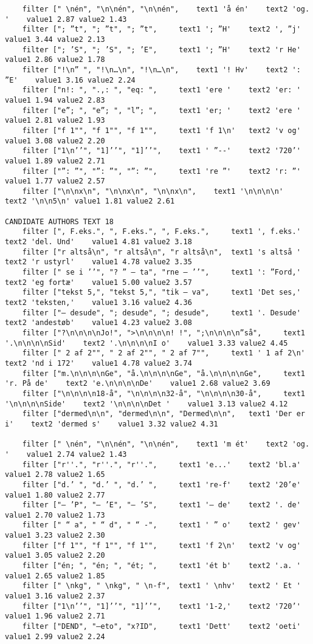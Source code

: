 {\begin{verbatim}
	filter [" \nén", "\n\nén", "\n\nén", 	text1 'å én'	text2 'og. '	value1 2.87	value2 1.43
	filter ["; ”t", "; ”t", "; ”t", 	text1 '; ”H'	text2 ', ”j'	value1 3.44	value2 2.13
	filter ["; ’S", "; ’S", "; ’E", 	text1 '; ”H'	text2 'r He'	value1 2.86	value2 1.78
	filter ["!\n” ", "!\n…\n", "!\n…\n", 	text1 '! Hv'	text2 ': ”E'	value1 3.16	value2 2.24
	filter ["n!: ", ".,: ", "eq: ", 	text1 'ere '	text2 'er: '	value1 1.94	value2 2.83
	filter ["e”; ", "e”; ", "l”; ", 	text1 'er; '	text2 'ere '	value1 2.81	value2 1.93
	filter ["f 1"", "f 1"", "f 1"", 	text1 'f 1\n'	text2 'v og'	value1 3.08	value2 2.20
	filter ["1\n’’", "1]’’", "1]’’", 	text1 ' ”--'	text2 '720’'	value1 1.89	value2 2.71
	filter ["”: ”", "”: ”", "”: ”", 	text1 're ”'	text2 'r: ”'	value1 1.77	value2 2.57
	filter ["\n\nx\n", "\n\nx\n", "\n\nx\n", 	text1 '\n\n\n\n'	text2 '\n\n5\n'	value1 1.81	value2 2.61

CANDIDATE AUTHORS TEXT 18
	filter [", F.eks.", ", F.eks.", ", F.eks.", 	text1 ', f.eks.'	text2 'del. Und'	value1 4.81	value2 3.18
	filter ["r altså\n", "r altså\n", "r altså\n", 	text1 's altså '	text2 'r ustyrl'	value1 4.78	value2 3.35
	filter [" se i ’’", "? ” – ta", "rne – ’’", 	text1 ': ”Ford,'	text2 'eg fortæ'	value1 5.00	value2 3.57
	filter ["tekst 5,", "tekst 5,", "tik – va", 	text1 'Det ses,'	text2 'teksten,'	value1 3.16	value2 4.36
	filter ["– desude", "; desude", "; desude", 	text1 '. Desude'	text2 'andestøb'	value1 4.23	value2 3.08
	filter ["?\n\n\n\nJo!", ">\n\n\n\n! !", ";\n\n\n\n”så", 	text1 '.\n\n\n\nSid'	text2 '.\n\n\n\nI o'	value1 3.33	value2 4.45
	filter [" 2 af 2"", " 2 af 2"", " 2 af 7"", 	text1 ' 1 af 2\n'	text2 'nd i 172'	value1 4.78	value2 3.74
	filter ["m.\n\n\n\nGe", "å.\n\n\n\nGe", "å.\n\n\n\nGe", 	text1 'r. På de'	text2 'e.\n\n\n\nDe'	value1 2.68	value2 3.69
	filter ["\n\n\n\n18-å", "\n\n\n\n32-å", "\n\n\n\n30-å", 	text1 '\n\n\n\nSide'	text2 '\n\n\n\nDet '	value1 3.13	value2 4.12
	filter ["dermed\n\n", "dermed\n\n", "Dermed\n\n", 	text1 'Der er i'	text2 'dermed s'	value1 3.32	value2 4.31

	filter [" \nén", "\n\nén", "\n\nén", 	text1 'm ét'	text2 'og. '	value1 2.74	value2 1.43
	filter ["r''.", "r''.", "r''.", 	text1 'e...'	text2 'bl.a'	value1 2.78	value2 1.65
	filter ["d.’ ", "d.’ ", "d.’ ", 	text1 're-f'	text2 '20’e'	value1 1.80	value2 2.77
	filter ["– ’P", "– ’E", "– ’S", 	text1 '– de'	text2 '. de'	value1 2.70	value2 1.73
	filter [" “ a", " “ d", " “ -", 	text1 ' ” o'	text2 ' gev'	value1 3.23	value2 2.30
	filter ["f 1"", "f 1"", "f 1"", 	text1 'f 2\n'	text2 'v og'	value1 3.05	value2 2.20
	filter ["én; ", "én; ", "ét; ", 	text1 'ét b'	text2 '.a. '	value1 2.65	value2 1.85
	filter [" \nkg", " \nkg", " \n-f", 	text1 ' \nhv'	text2 ' Et '	value1 3.16	value2 2.37
	filter ["1\n’’", "1]’’", "1]’’", 	text1 '1-2,'	text2 '720’'	value1 1.96	value2 2.71
	filter ["DEND", "–eto", "x?ID", 	text1 'Dett'	text2 'oeti'	value1 2.99	value2 2.24

\end{verbatim}
}
